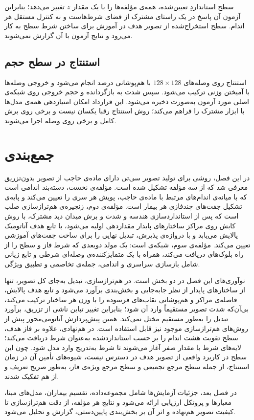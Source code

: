 سطح استانداردِ تعیین‌شده، همه‌ی مؤلفه‌ها را با یک مقدار $z$ تغییر می‌دهد؛ بنابراین آزمون آن پاسخ در یک راستای مشترک از فضای شرط‌هاست و نه کنترل مستقل هر اندام. سطح استخراج‌شده از تصویر هدف در آموزش برای ساختن شرط سطح به کار می‌رود و نتایج آزمون با آن گزارش نمی‌شوند.

\subsection{استنتاج در سطح حجم}
\label{sec:m-syn-volume}

استنتاج  روی وصله‌های $128\times128$ با هم‌پوشانی  درصد انجام می‌شود و خروجی وصله‌ها با آمیختن وزنی ترکیب می‌شود. سپس شدت به  بازگردانده و حجم خروجی روی شبکه‌ی اصلی مورد آزمون به‌صورت  ذخیره می‌شود. این قرارداد امکان امتیازدهی همه‌ی مدل‌ها با ابزار مشترک را فراهم می‌کند؛ روش استنتاج رقبا یکسان نیست و برخی روی برش کامل و برخی روی وصله اجرا می‌شوند.

\section{جمع‌بندی}
\label{sec:m-summary}

در این فصل، روشی برای تولید تصویر سی‌تی دارای ماده‌ی حاجب از تصویر بدون‌تزریق معرفی شد که از سه مؤلفه تشکیل شده است. مؤلفه‌ی نخست، دسته‌بند اندامی است که با میانه‌ی  اندام‌های مرتبط با ماده‌ی حاجب، پویش هر سری را تعیین می‌کند و پایه‌ی تشکیل جفت‌های چندفازی هر بیمار است. مؤلفه‌ی دوم، زنجیره‌ی هم‌ترازسازی صلب است که پس از استانداردسازی هندسه و شدت و برش میدان دید مشترک، با روش کابش روی مراکز ساختارهای پایدار مقداردهی اولیه می‌شود، با تابع هدف آناتومیک پالایش می‌یابد و با دروازه‌ی پذیرش، تبدیل نهایی را برای ساخت جفت‌های آموزشی تعیین می‌کند. مؤلفه‌ی سوم، شبکه‌ی  است: یک مولد  دوبعدی که شرط فاز و سطح را از راه بلوک‌های  دریافت می‌کند، همراه با یک متمایزکننده‌ی وصله‌ای شرطی و تابع زیانی شامل بازسازی سراسری و اندامی، جمله‌ی تخاصمی و تطبیق ویژگی.

نوآوری‌های این فصل در دو بخش است. در هم‌ترازسازی، تبدیل به‌جای کل تصویر، تنها از ساختارهای پایدار از نظر جابه‌جایی و بخش‌بندی برآورد می‌شود و تابع هدف پالایش، فاصله‌ی مراکز و هم‌پوشانی نقاب‌های فرسوده را با وزن هر ساختار ترکیب می‌کند، بی‌آن‌که شدت تصویر مستقیماً وارد آن شود؛ بنابراین تغییر تباین ناشی از تزریق، برآورد تبدیل را به‌طور مستقیم مختل نمی‌کند. همین پیش‌پردازش آناتومی‌محور پیش از روش‌های هم‌ترازسازی موجود نیز قابل استفاده است. در هم‌نهادی،  علاوه بر فاز هدف، سطح تقویت هشت اندام را بر حسب  استانداردشده به‌عنوان شرط دریافت می‌کند؛ لایه‌های شرط با مقدار صفر آغاز می‌شوند تا شرط به‌تدریج وارد مدل شود. چون این سطح در کاربرد واقعی از تصویر هدف در دسترس نیست، شیوه‌های تأمین آن در زمان استنتاج، از جمله سطح مرجع تجمیعی و سطح مرجع ویژه‌ی فاز، به‌طور صریح تعریف و از هم تفکیک شدند.

در فصل بعد، جزئیات آزمایش‌ها شامل مجموعه‌داده، تقسیم بیماران، مدل‌های مبنا، معیارها و پروتکل ارزیابی ارائه می‌شود و نتایج هر مؤلفه، از دقت هم‌ترازسازی تا کیفیت تصویر هم‌نهاده و اثر آن بر بخش‌بندی پایین‌دستی، گزارش و تحلیل می‌شود.
